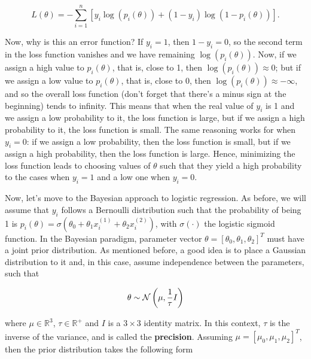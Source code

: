 \begin{equation}
  \label{eq:logistic_example_loss_function}
  L(\theta) = - \sum_{i = 1}^n \left[ y_i \log\left( p_i(\theta) \right) + (1 - y_i) \log \left( 1 - p_i(\theta) \right) \right].
\end{equation}

Now, why is this an error function? If $y_i = 1$, then $1 - y_i = 0$, so the second term in the loss function vanishes and we have remaining $\log\left( p_i(\theta) \right)$. Now, if we assign a high value to $p_i(\theta)$, that is, close to 1, then $\log\left( p_i(\theta) \right) \approx 0$; but if we assign a low value to $p_i(\theta)$, that is, close to 0, then $\log\left( p_i(\theta) \right) \approx -\infty$, and so the overall loss function (don't forget that there's a minus sign at the beginning) tends to infinity. This means that when the real value of $y_i$ is 1 and we assign a low probability to it, the loss function is large, but if we assign a high probability to it, the loss function is small. The same reasoning works for when $y_i = 0$: if we assign a low probability, then the loss function is small, but if we assign a high probability, then the loss function is large. Hence, minimizing the loss function leads to choosing values of $\theta$ such that they yield a high probability to the cases when $y_i = 1$ and a low one when $y_i = 0$.


Now, let's move to the Bayesian approach to logistic regression. As before, we will assume that $y_i$ follows a Bernoulli distribution such that the probability of being 1 is $p_i(\theta) = \sigma(\theta_0 + \theta_1 x_i^{(1)} + \theta_2 x_i^{(2)})$, with $\sigma \left( \cdot \right)$ the logistic sigmoid function. In the Bayesian paradigm, parameter vector $\theta = \left[ \theta_0, \theta_1, \theta_2 \right]^T$ must have a joint prior distribution. As mentioned before, a good idea is to place a Gaussian distribution to it and, in this case, assume independence between the parameters, such that

$$
  \theta \sim \mathcal{N}\left( \mu, \frac{1}{\tau} I \right)
$$

where $\mu \in \mathbb{R}^3$, $\tau \in \mathbb{R}^+$ and $I$ is a $3 \times 3$ identity matrix. In this context, $\tau$ is the inverse of the variance, and is called the \textbf{precision}. Assuming $\mu = \left[ \mu_0, \mu_1, \mu_2 \right]^T$, then the prior distribution takes the following form

